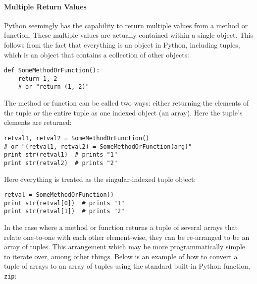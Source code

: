 \paragraph{Multiple Return Values}\label{sec:PythonMultipleReturnValues}

Python seemingly has the capability to return multiple values from a method or
function. These multiple values are actually contained within a single object.
This follows from the fact that everything is an object in Python, including
tuples, which is an object that contains a collection of other objects:

\begin{center}\begin{minipage}{.95\linewidth}\begin{lstlisting}
def SomeMethodOrFunction():
    return 1, 2
    # or "return (1, 2)"
\end{lstlisting}\end{minipage}\end{center}

The method or function can be called two ways: either returning the elements of
the tuple or the entire tuple as one indexed object (an array). Here the
tuple's elements are returned:

\begin{center}\begin{minipage}{.95\linewidth}\begin{lstlisting}
retval1, retval2 = SomeMethodOrFunction()
# or "(retval1, retval2) = SomeMethodOrFunction(arg)"
print str(retval1)  # prints "1"
print str(retval2)  # prints "2"
\end{lstlisting}\end{minipage}\end{center}

Here everything is treated as the singular-indexed tuple object:

\begin{center}\begin{minipage}{.95\linewidth}\begin{lstlisting}
retval = SomeMethodOrFunction()
print str(retval[0])  # prints "1"
print str(retval[1])  # prints "2"
\end{lstlisting}\end{minipage}\end{center}

In the case where a method or function returns a tuple of several arrays that
relate one-to-one with each other element-wise, they can be re-arranged to be an
array of tuples.  This arrangement which may be more programmatically simple to iterate over,
among other things. Below is an example of how to convert a tuple of arrays to
an array of tuples using the standard built-in Python function, \texttt{zip}:

